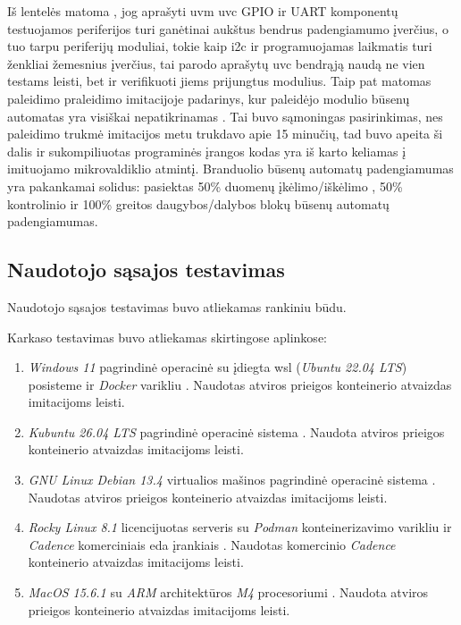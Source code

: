 Iš lentelės matoma \lent{\ref{tab:test_cov_imc}}, jog aprašyti \gls{uvm} \gls{uvc} GPIO ir UART komponentų testuojamos periferijos turi ganėtinai aukštus bendrus padengiamumo įverčius, o tuo tarpu periferijų moduliai, tokie kaip \gls{i2c} ir programuojamas laikmatis \pav{\ref{fig:test_cov_top}} turi ženkliai žemesnius įverčius, tai parodo aprašytų \gls{uvc} bendrąją naudą ne vien testams leisti, bet ir verifikuoti jiems prijungtus modulius. Taip pat matomas paleidimo praleidimo imitacijoje padarinys, kur paleidėjo modulio būsenų automatas yra visiškai nepatikrinamas \pav{\ref{fig:test_cov_bootloader_fsm}}. Tai buvo sąmoningas pasirinkimas, nes paleidimo trukmė imitacijos metu trukdavo apie 15 minučių, tad buvo apeita ši dalis ir sukompiliuotas programinės įrangos kodas yra iš karto keliamas į imituojamo mikrovaldiklio atmintį. Branduolio būsenų automatų padengiamumas yra pakankamai solidus: pasiektas 50\% duomenų įkėlimo/iškėlimo \pav{\ref{fig:test_cov_ibex_ls_fst}}, 50\% kontrolinio \pav{\ref{fig:test_cov_ibex_ctrl_fsm}} ir 100\% greitos daugybos/dalybos \pav{\ref{fig:test_cov_ibex_md_fsm}} blokų būsenų automatų padengiamumas.

\subsection{Naudotojo sąsajos testavimas}

Naudotojo sąsajos testavimas buvo atliekamas rankiniu būdu.

Karkaso testavimas buvo atliekamas skirtingose aplinkose:

\begin{enumerate}
	\item \textit{Windows 11} pagrindinė operacinė su įdiegta \gls{wsl} (\textit{Ubuntu 22.04 LTS}) posisteme ir \textit{Docker} varikliu \pav{\ref{fig:test_os_windows11}}. Naudotas atviros prieigos konteinerio atvaizdas imitacijoms leisti.
	\item \textit{Kubuntu 26.04 LTS} pagrindinė operacinė sistema \pav{\ref{fig:test_os_kubuntu}}. Naudota atviros prieigos konteinerio atvaizdas imitacijoms leisti.
	\item \textit{GNU Linux Debian 13.4​} virtualios mašinos pagrindinė operacinė sistema \pav{\ref{fig:test_os_debian}}. Naudotas atviros prieigos konteinerio atvaizdas imitacijoms leisti.
	\item \textit{Rocky Linux 8.1} licencijuotas serveris su \textit{Podman} konteinerizavimo varikliu ir \textit{Cadence} komerciniais \gls{eda} įrankiais \pav{\ref{fig:test_os_rockylinux}}. Naudotas komercinio \textit{Cadence} konteinerio atvaizdas imitacijoms leisti.
	\item \textit{MacOS 15.6.1​} su \textit{ARM} architektūros \textit{M4} procesoriumi \pav{\ref{fig:test_os_macos}}. Naudota atviros prieigos konteinerio atvaizdas imitacijoms leisti.
\end{enumerate}

